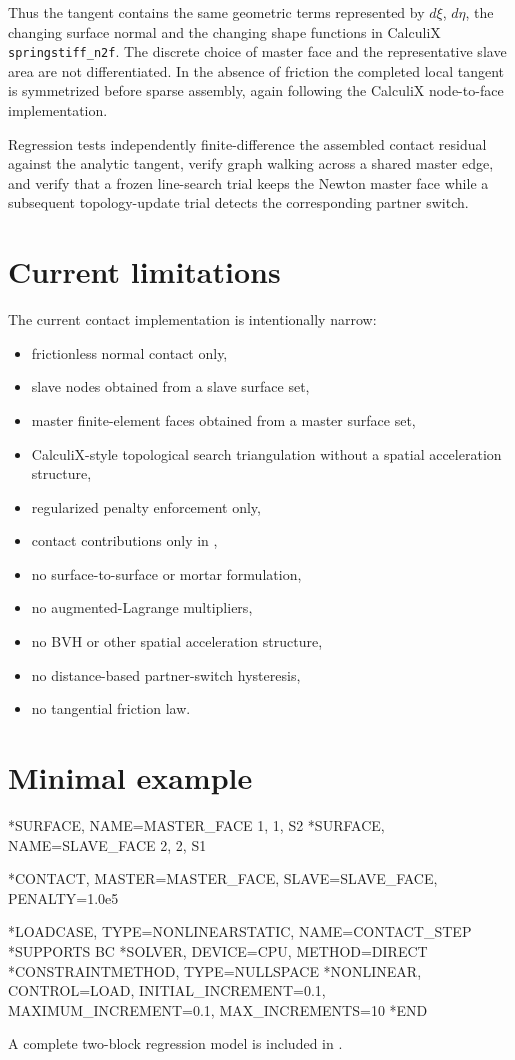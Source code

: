 Thus the tangent contains the same geometric terms represented by \(d\xi\), \(d\eta\), the changing surface normal and the changing shape functions in CalculiX \texttt{springstiff\_n2f}. The discrete choice of master face and the representative slave area are not differentiated. In the absence of friction the completed local tangent is symmetrized before sparse assembly, again following the CalculiX node-to-face implementation.

Regression tests independently finite-difference the assembled contact residual against the analytic tangent, verify graph walking across a shared master edge, and verify that a frozen line-search trial keeps the Newton master face while a subsequent topology-update trial detects the corresponding partner switch.

\section{Current limitations}

The current contact implementation is intentionally narrow:

\begin{itemize}
\item frictionless normal contact only,
\item slave nodes obtained from a slave surface set,
\item master finite-element faces obtained from a master surface set,
\item CalculiX-style topological search triangulation without a spatial acceleration structure,
\item regularized penalty enforcement only,
\item contact contributions only in ,
\item no surface-to-surface or mortar formulation,
\item no augmented-Lagrange multipliers,
\item no BVH or other spatial acceleration structure,
\item no distance-based partner-switch hysteresis,
\item no tangential friction law.
\end{itemize}

\section{Minimal example}

\begin{exampledeck}
*SURFACE, NAME=MASTER_FACE
1, 1, S2
*SURFACE, NAME=SLAVE_FACE
2, 2, S1

*CONTACT, MASTER=MASTER_FACE, SLAVE=SLAVE_FACE, PENALTY=1.0e5

*LOADCASE, TYPE=NONLINEARSTATIC, NAME=CONTACT_STEP
*SUPPORTS
BC
*SOLVER, DEVICE=CPU, METHOD=DIRECT
*CONSTRAINTMETHOD, TYPE=NULLSPACE
*NONLINEAR, CONTROL=LOAD, INITIAL_INCREMENT=0.1, MAXIMUM_INCREMENT=0.1, MAX_INCREMENTS=10
*END
\end{exampledeck}

A complete two-block regression model is included in .
